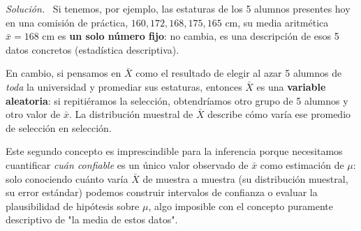 \documentclass[11pt,a4paper]{article}
\newenvironment{solucion}{\par\noindent\textit{Solución.}~}{\par\vspace{1em}}
\begin{document}
\begin{solucion}
Si tenemos, por ejemplo, las estaturas de los 5 alumnos presentes hoy en una comisión de práctica, $160, 172, 168, 175, 165$ cm, su media aritmética $\bar x = 168$ cm es \textbf{un solo número fijo}: no cambia, es una descripción de esos 5 datos concretos (estadística descriptiva).

En cambio, si pensamos en $\bar X$ como el resultado de elegir al azar 5 alumnos de \emph{toda} la universidad y promediar sus estaturas, entonces $\bar X$ es una \textbf{variable aleatoria}: si repitiéramos la selección, obtendríamos otro grupo de 5 alumnos y otro valor de $\bar x$. La distribución muestral de $\bar X$ describe cómo varía ese promedio de selección en selección.

Este segundo concepto es imprescindible para la inferencia porque necesitamos cuantificar \emph{cuán confiable} es un único valor observado de $\bar x$ como estimación de $\mu$: solo conociendo cuánto varía $\bar X$ de muestra a muestra (su distribución muestral, su error estándar) podemos construir intervalos de confianza o evaluar la plausibilidad de hipótesis sobre $\mu$, algo imposible con el concepto puramente descriptivo de "la media de estos datos".
\end{solucion}
\end{document}
